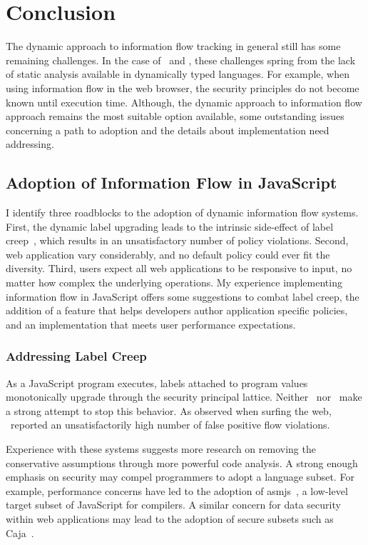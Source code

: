 
\chapter{Conclusion}
\label{ch:conclusion}

The dynamic approach to information flow tracking in general still has some remaining challenges.
In the case of \JitFlow\ and \FlowCore, these challenges spring from the lack of static analysis available in dynamically typed languages.
For example, when using information flow in the web browser, the security principles do not become known until execution time.
Although, the dynamic approach to information flow approach remains the most suitable option available, some outstanding issues concerning a path to adoption and the details about implementation need addressing.

\section{Adoption of Information Flow in JavaScript}

I identify three roadblocks to the adoption of dynamic information flow systems.
First, the dynamic label upgrading leads to the intrinsic side-effect of label creep~\cite{sabelfeld.myers+03,denning+82}, which results in an unsatisfactory number of policy violations.
Second, web application vary considerably, and no default policy could ever fit the diversity.
Third, users expect all web applications to be responsive to input, no matter how complex the underlying operations.
My experience implementing information flow in JavaScript offers some suggestions to combat label creep, the addition of a feature that helps developers author application specific policies, and an implementation that meets user performance expectations.

\subsection{Addressing Label Creep}

As a JavaScript program executes, labels attached to program values monotonically upgrade through the security principal lattice.
Neither \FlowCore\ nor \JitFlow\ make a strong attempt to stop this behavior.
As observed when surfing the web, \JitFlow\ reported an unsatisfactorily high number of false positive flow violations.

Experience with these systems suggests more research on removing the conservative assumptions through more powerful code analysis.
A strong enough emphasis on security may compel programmers to adopt a language subset.
For example, performance concerns have led to the adoption of asmjs~\cite{asmjs}, a low-level target subset of JavaScript for compilers.
A similar concern for data security within web applications may lead to the adoption of secure subsets such as Caja~\cite{caja}.

